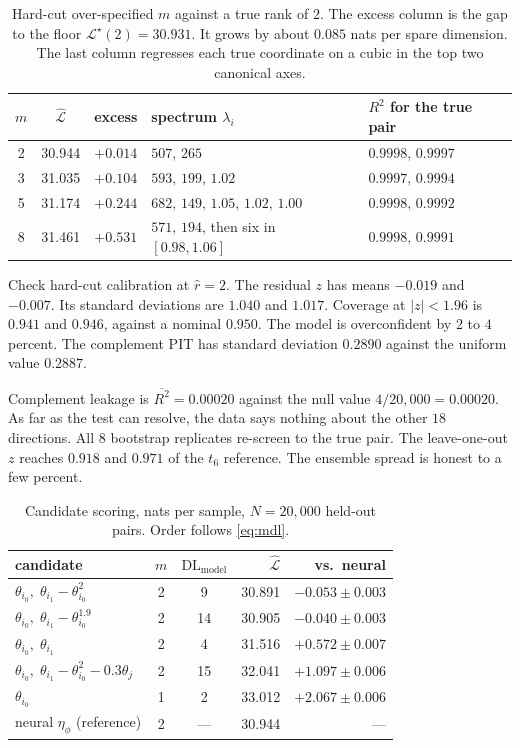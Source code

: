 \documentclass[11pt, letterpaper]{article}
\theoremstyle{definition}
\begin{document}
\begin{table}[h]
\centering
\begin{tabular}{cccll}
\toprule
$m$ & $\hat{\mathcal{L}}$ & excess & spectrum $\lambda_i$ & $R^2$ for the true pair \\
\midrule
2 & 30.944 & $+0.014$ & $507,\, 265$ & $0.9998,\, 0.9997$ \\
3 & 31.035 & $+0.104$ & $593,\, 199,\, 1.02$ & $0.9997,\, 0.9994$ \\
5 & 31.174 & $+0.244$ & $682,\, 149,\, 1.05,\, 1.02,\, 1.00$ & $0.9998,\, 0.9992$ \\
8 & 31.461 & $+0.531$ & $571,\, 194$, then six in $[0.98,1.06]$ & $0.9998,\, 0.9991$ \\
\bottomrule
\end{tabular}
\caption{Hard-cut over-specified $m$ against a true rank of $2$. The excess
column is the gap to the floor $\mathcal{L}^\star(2)=30.931$.
It grows by about $0.085$ nats per spare dimension.
The last column regresses each true coordinate on a cubic in the top two
canonical axes.}
\label{tab:overspec}
\end{table}

Check hard-cut calibration at $\hat r=2$.
The residual $z$ has means $-0.019$ and $-0.007$.
Its standard deviations are $1.040$ and $1.017$.
Coverage at $|z|<1.96$ is $0.941$ and $0.946$, against a nominal $0.950$.
The model is overconfident by $2$ to $4$ percent.
The complement PIT has standard deviation $0.2890$ against the uniform value
$0.2887$.

Complement leakage is $\overline{R^2}=0.00020$ against the null value
$4/20{,}000=0.00020$.
As far as the test can resolve, the data says nothing about the other $18$
directions. All $8$ bootstrap replicates re-screen to the true pair.
The leave-one-out $z$ reaches $0.918$ and $0.971$ of the $t_6$ reference.
The ensemble spread is honest to a few percent.

\begin{table}[h]
\centering
\begin{tabular}{lccrr}
\toprule
candidate & $m$ & $\mathrm{DL}_{\mathrm{model}}$ & $\hat{\mathcal{L}}$ & vs.\ neural \\
\midrule
$\theta_{i_0},\;\theta_{i_1}-\theta_{i_0}^2$      & 2 & 9  & 30.891 & $-0.053\pm0.003$ \\
$\theta_{i_0},\;\theta_{i_1}-\theta_{i_0}^{1.9}$  & 2 & 14 & 30.905 & $-0.040\pm0.003$ \\
$\theta_{i_0},\;\theta_{i_1}$                     & 2 & 4  & 31.516 & $+0.572\pm0.007$ \\
$\theta_{i_0},\;\theta_{i_1}-\theta_{i_0}^2-0.3\theta_j$ & 2 & 15 & 32.041 & $+1.097\pm0.006$ \\
$\theta_{i_0}$                                    & 1 & 2  & 33.012 & $+2.067\pm0.006$ \\
\midrule
neural $\eta_\phi$ (reference)                    & 2 & --- & 30.944 & --- \\
\bottomrule
\end{tabular}
\caption{Candidate scoring, nats per sample, $N=20{,}000$ held-out pairs.
Order follows \eqref{eq:mdl}.}
\end{table}
\end{document}
